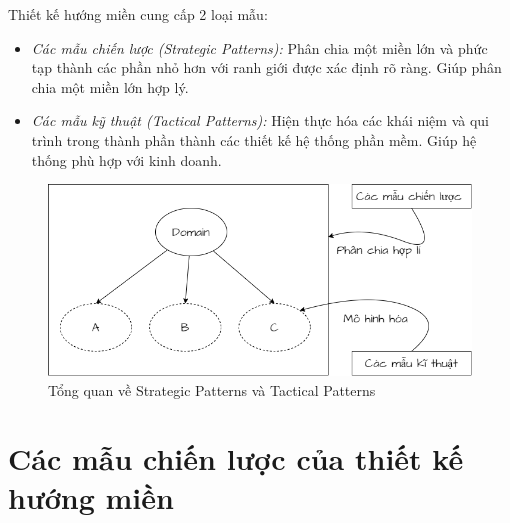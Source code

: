Thiết kế hướng miền cung cấp 2 loại mẫu:

\begin{itemize}

    \item \emph{Các mẫu chiến lược (Strategic Patterns):} Phân chia một miền lớn và phức tạp thành các phần nhỏ hơn với ranh giới được xác định rõ ràng. Giúp phân chia một miền lớn hợp lý.

    \item \emph{Các mẫu kỹ thuật (Tactical Patterns):} Hiện thực hóa các khái niệm và qui trình trong thành phần thành các thiết kế hệ thống phần mềm. Giúp hệ thống phù hợp với kinh doanh.

\end{itemize}

\begin{figure}[H]

    \centering

    \includegraphics[scale = 0.5]{pictures/cac_mau_chien_luoc_va_cac_mau_ky_thuat/main.drawio.png}

    \caption{Tổng quan về Strategic Patterns và Tactical Patterns}

\end{figure}


\section{Các mẫu chiến lược của thiết kế hướng miền}


